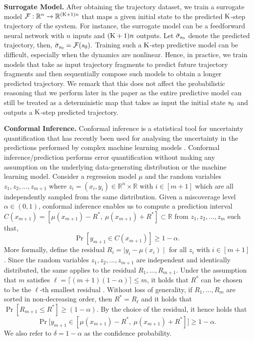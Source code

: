  \textbf{Surrogate Model. } After obtaining the trajectory dataset, we train a surrogate model $\mathcal{F}: \mathbb{R}^n \to \mathbb{R}^{(\mathrm{K}+1) n}$ that maps a given initial state to the predicted $\mathrm{K}$-step
trajectory of the system. For instance, the surrogate model can be a feedforward neural network with $n$ inputs
and $(\mathrm{K}+1)n$ outputs. Let $\bar{\sigma}_{s_0}$ denote the predicted trajectory, then, \(
 \bar{\sigma}_{s_0} = \mathcal{F}(s_0).\)
 Training such a $\mathrm{K}$-step predictive model can be difficult, especially when the dynamics are 
 nonlinear. Hence, in practice, we train models that take as input trajectory fragments to predict
 future trajectory fragments and then sequentially compose such models to obtain a longer predicted 
 trajectory. We remark that this does not affect the probabilistic reasoning that we perform later
 in the paper as the entire predictive model can still be treated as a deterministic map that
 takes as input the initial state $s_0$ and outputs a $\mathrm{K}$-step predicted trajectory.

 \textbf{Conformal Inference.} Conformal inference \cite{vovk2005algorithmic,lei2014distribution,lei2018distribution} is a statistical tool for uncertainty quantification that has recently been used for analysing the uncertainty in the predictions performed by complex machine learning models \cite{angelopoulos2021gentle,lindemann2023safe,luo2022sample}. Conformal inference/prediction performs error quantification without making any assumption on the underlying data-generating distribution or the machine learning model. Consider a regression model $\mu$ and the random variables $z_1,z_2,...,z_{m+1}$ where $z_i=(x_i,y_i) \in \mathbb{R}^n \times \mathbb{R}$ with $ i\in [m+1]$ which are all independently sampled from the same distribution. Given a miscoverage level $\alpha \in (0, 1)$, conformal inference enables us to compute a prediction interval $C(x_{m+1})=[\mu(x_{m+1})-R^*,\ \mu(x_{m+1})+R^*] \subset \mathbb{R}$ from $z_1,z_2,...,z_{m}$ such that,
$$
\Pr[ y_{m+1} \in C(x_{m+1})] \geq 1- \alpha.
$$
More formally, define the residual  $R_i=\mid y_i-\mu(x_i) \mid$ for all $z_i$ with $i\in [m+1]$. Since the random variables $z_1,z_2,...,z_{m+1}$ are independent and identically distributed, the same applies to the residual $R_1,\hdots, R_{m+1}$. Under the assumption that $m$ satisfies $\ell=\lceil (m+1)(1-\alpha)\rceil\le m$, it holds that $R^*$ can be chosen to be the $\ell$-th smallest residual \cite[Lemma 1]{tibshirani2019conformal}. Without loss of generality, if $R_1,\hdots, R_{m}$ are sorted in non-decreasing order, then $R^*=R_\ell$ and it holds that $\Pr[ R_{m+1} \leq R^*] \geq (1-\alpha)$. By the choice of the residual, it hence holds that
$$
\Pr\Big[ y_{m+1} \in [\mu(x_{m+1})-R^*,\ \mu(x_{m+1})+R^*] \Big] \geq 1-\alpha.
$$
We also refer to $\delta = 1-\alpha$ as the confidence probability.




